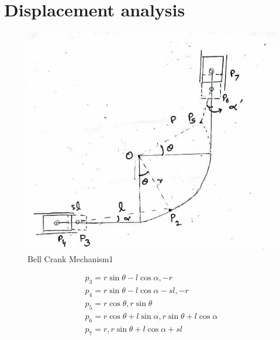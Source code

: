 \documentclass[12pt,a4paper]{article}
\begin{document}
	\section{Displacement analysis}
		\begin{figure}[H]
		\label{fig1}
		\centering
		\includegraphics[scale=0.5]{bell}
		\caption{Bell Crank Mechanism1}
	\end{figure}
	\begin{eqnarray}
   p _{3}= r\sin{\theta}-l\cos{\alpha},-r\\
   p _{4}= r\sin{\theta}-l\cos{\alpha}-sl,-r\\
   p _{5}= r\cos{\theta},r\sin{\theta}\\
   p _{6}= r\cos{\theta}+l\sin{\alpha},r\sin{\theta}+l\cos{\alpha}\\
   p _{7}= r,r\sin{\theta}+l\cos{\alpha}+sl\\
	\end{eqnarray}
\end{document}
